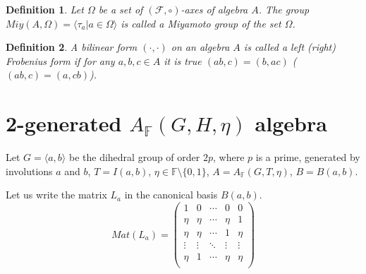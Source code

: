 \documentclass[12pt]{article}
\newcounter{parag}
\newcommand\F{\mathbb{F}}
\newcommand\cF{\mathcal{F}}
\newcommand\la{\langle}
\newcommand\ra{\rangle}
\newtheorem{defi}{Definition}
\begin{document}
\begin{defi} Let $\Omega$ be a set of $(\cF,\circ)$-axes of algebra $A$. 
The group $Miy(A,\Omega)=\la \tau_a|a\in \Omega\ra$ is called a Miyamoto group of the set $\Omega$.
\end{defi}

  
\begin{defi}	
	A bilinear form $(\cdot ,\cdot )$ on an algebra $A$ is called a left (right) Frobenius form if for any $a,b,c\in A$ it is true $(ab,c)=(b,ac)$ ($(ab,c)=(a,cb)$).
\end{defi}	

\section{2-generated $A_{\F}(G,H,\eta)$ algebra}
Let $G=\langle a,b\rangle$ be the dihedral group of order $2p$, where $p$ is a prime, generated by involutions $a$ and $b$, $T=I(a,b)$, $\eta\in\F\setminus\{0,1\}$, $A=A_{\F}(G,T,\eta)$, $B=B(a,b)$.	

Let us write the matrix $L_{a}$ in the canonical basis $B(a,b)$.
	$$
	Mat(L_{a})=\begin{pmatrix}
		1    & 0    &\cdots&0    &0 \\
		\eta & \eta &\cdots& \eta& 1\\ 
		\eta & \eta &\cdots& 1& \eta\\
		\vdots&\vdots& \ddots & \vdots&\vdots\\
		\eta & 1&\cdots& \eta& \eta\\
	\end{pmatrix}
	$$
	
\end{document}
